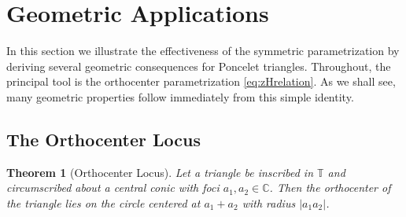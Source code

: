 \documentclass[11pt,reqno]{amsart}
\newtheorem{theorem}{Theorem}[section]
\theoremstyle{definition}
\numberwithin{equation}{section}
\begin{document}
\section{Geometric Applications}\label{sec:geomapp}

In this section we illustrate the effectiveness of the symmetric parametrization by deriving several geometric consequences for Poncelet triangles. Throughout, the principal tool is the orthocenter parametrization \eqref{eq:zHrelation}. As we shall see, many geometric properties follow immediately from this simple identity.

\subsection{The Orthocenter Locus}
\begin{theorem}[Orthocenter Locus]\label{thm:orthcirc}
Let a triangle be inscribed in $\mathbb T$ and circumscribed about a central conic with foci $a_1,a_2\in\mathbb C$. Then the orthocenter of the triangle lies on the circle centered at $a_1+a_2$ with radius $|a_1a_2|$.
\end{theorem}
\end{document}
